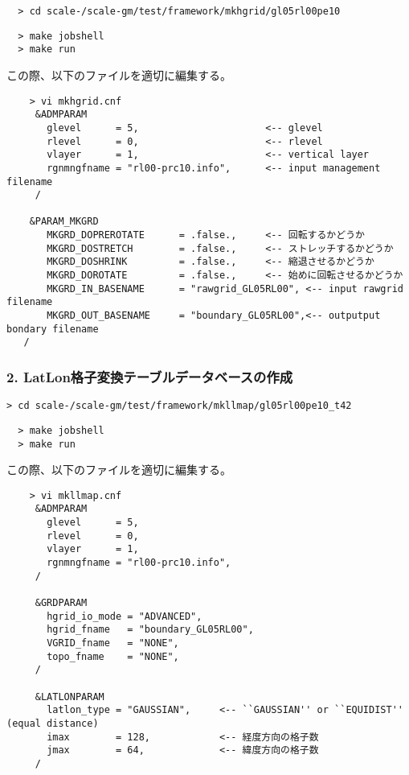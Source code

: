 \begin{enumerate}
\verb|  > cd scale-|{\version}\verb|/scale-gm/test/framework/mkhgrid/gl05rl00pe10|
\vspace{-4mm}
\begin{verbatim}
  > make jobshell
  > make run
\end{verbatim}
 この際、以下のファイルを適切に編集する。
 \begin{verbatim}
    > vi mkhgrid.cnf
     &ADMPARAM
       glevel      = 5,                      <-- glevel
       rlevel      = 0,                      <-- rlevel
       vlayer      = 1,                      <-- vertical layer
       rgnmngfname = "rl00-prc10.info",      <-- input management filename
     /

    &PARAM_MKGRD
       MKGRD_DOPREROTATE      = .false.,     <-- 回転するかどうか
       MKGRD_DOSTRETCH        = .false.,     <-- ストレッチするかどうか
       MKGRD_DOSHRINK         = .false.,     <-- 縮退させるかどうか
       MKGRD_DOROTATE         = .false.,     <-- 始めに回転させるかどうか
       MKGRD_IN_BASENAME      = "rawgrid_GL05RL00", <-- input rawgrid filename
       MKGRD_OUT_BASENAME     = "boundary_GL05RL00",<-- outputput bondary filename
   /
\end{verbatim}
\end{enumerate}

\subsubsection{2. LatLon格子変換テーブルデータベースの作成}

\verb|> cd scale-|{\version}\verb|/scale-gm/test/framework/mkllmap/gl05rl00pe10_t42|
\vspace{-3mm}
\begin{verbatim}
  > make jobshell
  > make run
\end{verbatim}
 この際、以下のファイルを適切に編集する。
 \begin{verbatim}
    > vi mkllmap.cnf
     &ADMPARAM
       glevel      = 5,
       rlevel      = 0,
       vlayer      = 1,
       rgnmngfname = "rl00-prc10.info",
     /

     &GRDPARAM
       hgrid_io_mode = "ADVANCED",
       hgrid_fname   = "boundary_GL05RL00",
       VGRID_fname   = "NONE",
       topo_fname    = "NONE",
     /

     &LATLONPARAM
       latlon_type = "GAUSSIAN",     <-- ``GAUSSIAN'' or ``EQUIDIST'' (equal distance)
       imax        = 128,            <-- 経度方向の格子数
       jmax        = 64,             <-- 緯度方向の格子数
     /
 \end{verbatim}


